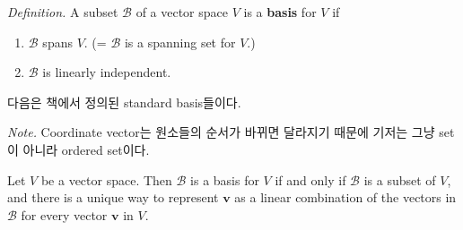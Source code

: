 \textit{Definition.} A subset $\mathcal{B}$ of a vector space $V$ is a \textbf{basis} for $V$ if \begin{enumerate}
	\item $\mathcal{B}$ spans $V$. (= $\mathcal{B}$ is a spanning set for $V$.)
	\item $\mathcal{B}$ is linearly independent.
\end{enumerate}

다음은 책에서 정의된 standard basis들이다.

\textit{Note.} Coordinate vector는 원소들의 순서가 바뀌면 달라지기 때문에 기저는 그냥 set이 아니라 ordered set이다.

\begin{theorem}
	Let $V$ be a vector space. Then $\mathcal{B}$ is a basis for $V$ if and only if {\color{blue} $\mathcal{B}$ is a subset of $V$,} and there is a unique way to represent $\textbf{v}$ as a linear combination of the vectors in $\mathcal{B}$ for every vector $\textbf{v}$ in $V$.
\end{theorem}

